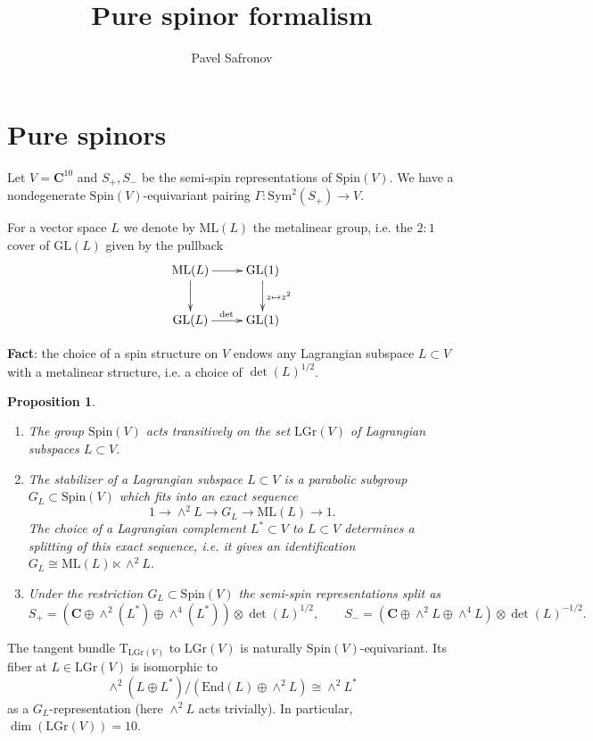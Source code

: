 \documentclass[12pt]{amsart}
\newcommand{\C}{\mathbf{C}}
\newcommand{\T}{\mathrm{T}}
\newcommand{\End}{\mathrm{End}}
\newcommand{\GL}{\mathrm{GL}}
\newcommand{\LGr}{\mathrm{LGr}}
\newcommand{\ML}{\mathrm{ML}}
\newcommand{\Spin}{\mathrm{Spin}}
\newcommand{\Sym}{\mathrm{Sym}}
\newtheorem{prop}[thm]{Proposition}
\theoremstyle{definition}
\theoremstyle{remark}
\begin{document}
\title{Pure spinor formalism}
\author{Pavel Safronov}
\maketitle

\section{Pure spinors}

Let $V=\C^{10}$ and $S_+, S_-$ be the semi-spin representations of $\Spin(V)$. We have a nondegenerate $\Spin(V)$-equivariant pairing $\Gamma\colon \Sym^2(S_+)\rightarrow V$.

For a vector space $L$ we denote by $\ML(L)$ the metalinear group, i.e. the $2:1$ cover of $\GL(L)$ given by the pullback
\[
\xymatrix{
\ML(L) \ar[r] \ar[d] & \GL(1) \ar^{z\mapsto z^2}[d] \\
\GL(L) \ar^{\det}[r] & \GL(1)
}
\]

\textbf{Fact}: the choice of a spin structure on $V$ endows any Lagrangian subspace $L\subset V$ with a metalinear structure, i.e. a choice of $\det(L)^{1/2}$.

\begin{prop}$ $
\begin{enumerate}
\item The group $\Spin(V)$ acts transitively on the set $\LGr(V)$ of Lagrangian subspaces $L\subset V$.

\item The stabilizer of a Lagrangian subspace $L\subset V$ is a parabolic subgroup $G_L\subset \Spin(V)$ which fits into an exact sequence
\[1\longrightarrow \wedge^2 L\longrightarrow G_L\longrightarrow \ML(L)\longrightarrow 1.\]
The choice of a Lagrangian complement $L^*\subset V$ to $L\subset V$ determines a splitting of this exact sequence, i.e. it gives an identification $G_L\cong \ML(L)\ltimes \wedge^2 L$.

\item Under the restriction $G_L\subset \Spin(V)$ the semi-spin representations split as
\[S_+ = (\C\oplus \wedge^2(L^*)\oplus \wedge^4(L^*))\otimes \det(L)^{1/2},\qquad S_- = (\C\oplus \wedge^2L\oplus \wedge^4 L)\otimes \det(L)^{-1/2}.\]
\end{enumerate}
\end{prop}

The tangent bundle $\T_{\LGr(V)}$ to $\LGr(V)$ is naturally $\Spin(V)$-equivariant. Its fiber at $L\in\LGr(V)$ is isomorphic to
\[\wedge^2(L\oplus L^*) / (\End(L)\oplus \wedge^2 L)\cong \wedge^2 L^*\]
as a $G_L$-representation (here $\wedge^2 L$ acts trivially). In particular, $\dim(\LGr(V)) = 10$.
\end{document}
